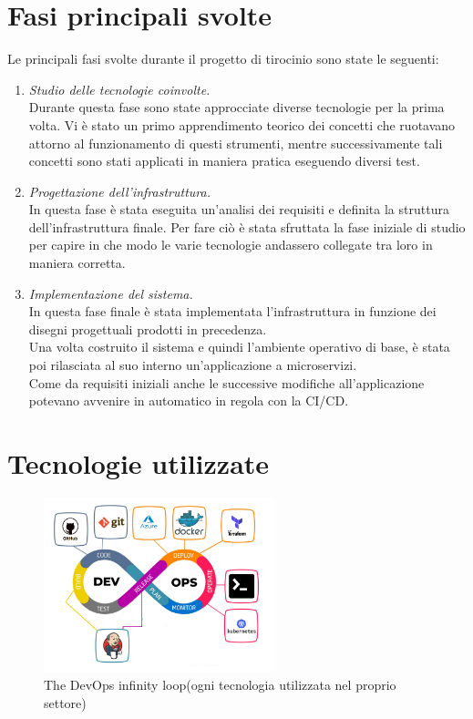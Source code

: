 \documentclass[a4paper,12pt]{report}
\begin{document}
\section{Fasi principali svolte}
Le principali fasi svolte durante il progetto di tirocinio sono state le seguenti:
\begin{enumerate}
\item \textit{Studio delle tecnologie coinvolte.} \\
Durante questa fase sono state approcciate diverse tecnologie per la prima volta. Vi è stato un primo apprendimento teorico dei concetti che ruotavano attorno al funzionamento di questi strumenti, mentre successivamente tali concetti sono stati applicati in maniera pratica eseguendo diversi test.
\item \textit{Progettazione dell'infrastruttura.} \\
In questa fase è stata eseguita un'analisi dei requisiti e definita la struttura dell'infrastruttura finale. Per fare ciò è stata sfruttata la fase iniziale di studio per capire in che modo le varie tecnologie andassero collegate tra loro in maniera corretta.
\item \textit{Implementazione del sistema.}\\
In questa fase finale è stata implementata l'infrastruttura in funzione dei disegni progettuali prodotti in precedenza.\\
Una volta costruito il sistema e quindi l'ambiente operativo di base, è stata poi rilasciata al suo interno un'applicazione a microservizi. \\
Come da requisiti iniziali anche le successive modifiche all'applicazione potevano avvenire in automatico in regola con la CI/CD. \\
\end{enumerate}

\section{Tecnologie utilizzate}
\begin{figure}[h]
	\includegraphics[width=0.6\textwidth]{tech_used}
    \caption{The DevOps infinity loop(ogni tecnologia utilizzata nel proprio settore) \cite{devopsloopimg}}
    \label{fig:tech_used}
\end{figure}
\end{document}

